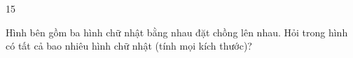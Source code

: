 \begin{probbox}{15}{\relax}
\begin{minipage}[t]{0.52\linewidth}\vspace{0pt}
Hình bên gồm ba hình chữ nhật bằng nhau đặt chồng lên nhau. Hỏi trong hình có tất cả bao nhiêu hình chữ nhật (tính mọi kích thước)?
\end{minipage}\hfill
\begin{minipage}[t]{0.44\linewidth}\vspace{0pt}
\centering{}
\end{minipage}
\end{probbox}

